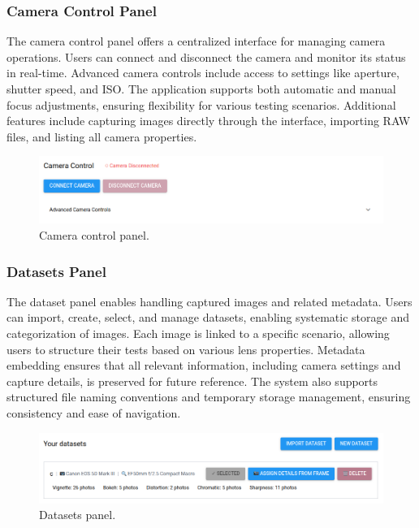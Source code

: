 \subsubsection{Camera Control Panel}
The camera control panel offers a centralized interface for managing camera operations. Users can connect and disconnect the camera and monitor its status in real-time. Advanced camera controls include access to settings like aperture, shutter speed, and ISO. The application supports both automatic and manual focus adjustments, ensuring flexibility for various testing scenarios. Additional features include capturing images directly through the interface, importing RAW files, and listing all camera properties.

\begin{figure}[h]
\centering
\includegraphics[width=1\textwidth]{Images/camera_control.png}
\caption{Camera control panel.}
\label{fig:ui_camera_control}
\end{figure}

\subsubsection{Datasets Panel}
The dataset panel enables handling captured images and related metadata. Users can import, create, select, and manage datasets, enabling systematic storage and categorization of images. Each image is linked to a specific scenario, allowing users to structure their tests based on various lens properties. Metadata embedding ensures that all relevant information, including camera settings and capture details, is preserved for future reference. The system also supports structured file naming conventions and temporary storage management, ensuring consistency and ease of navigation.

\begin{figure}[h]
\centering
\includegraphics[width=1\textwidth]{Images/datasets_panel.png}
\caption{Datasets panel.}
\label{fig:ui_datasets}
\end{figure}


